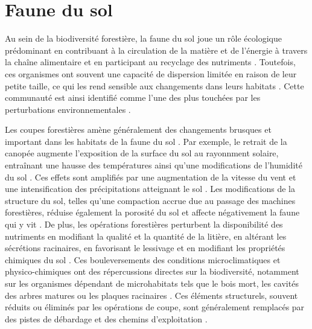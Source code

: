 \section*{Faune du sol}
\label{sec:soilfauna}


Au sein de la biodiversité forestière, la faune du sol joue un rôle écologique prédominant en contribuant à la circulation de la matière et de l'énergie à travers la chaîne alimentaire et en participant au recyclage des nutriments \citep{Seibold2021contributioninsects,Kudrin2023metaanalysiseffects}. 
Toutefois, ces organismes ont souvent une capacité de dispersion limitée en raison de leur petite taille, ce qui les rend sensible aux changements dans leurs habitats \citep{Kudrin2023metaanalysiseffects}. 
Cette communauté est ainsi identifié comme l'une des plus touchées par les perturbations environnementales \citep{Marshall2000Impactsforest,Coyle2017Soilfauna}. 

Les coupes forestières amène généralement des changements brusques et important dans les habitats de la faune du sol \citep{Lindo2003Microbialbiomass,Paillet2010Biodiversitydifferences,Fedrowitz2014Canretention,Chaudhary2016Impactforest}. 
Par exemple, le retrait de la canopée augmente l'exposition de la surface du sol au rayonnment solaire, entraînant une hausse des températures ainsi qu'une modifications de l'humidité du sol \citep{Lindo2003Microbialbiomass,Brook2008Synergiesextinction,Zhang2022Intensiveforest}. 
Ces effets sont amplifiés par une augmentation de la vitesse du vent et une intensification des précipitations atteignant le sol \citep{Keenan1993ecologicaleffects,Heithecker2007Edgerelatedgradients}. 
Les modifications de la structure du sol, telles qu'une compaction accrue due au passage des machines forestières, réduise également la porosité du sol et affecte négativement la faune qui y vit \citep{Battigelli2004Shorttermimpact,Mazerolle2021Woodlandsalamander}. 
De plus, les opérations forestières perturbent la disponibilité des nutriments en modifiant la qualité et la quantité de la litière, en altérant les sécrétions racinaires, en favorisant le lessivage et en modifiant les propriétés chimiques du sol \citep{Covington1981Changesforest,Marshall2000Impactsforest,Lindo2003Microbialbiomass,Battigelli2004Shorttermimpact}. 
Ces bouleversements des conditions microclimatiques et physico-chimiques ont des répercussions directes sur la biodiversité, 
notamment sur les organismes dépendant de microhabitats tels que le bois mort, les cavités des arbres matures ou les plaques racinaires \citep{Spies1999Dynamicforest,Christensen2005Deadwood,Brassard2008EffectsForest}. 
Ces éléments structurels, souvent réduits ou éliminés par les opérations de coupe, sont généralement remplacés par des pistes de débardage et des chemins d'exploitation \citep{Hansen1991ConservingBiodiversity}. 

